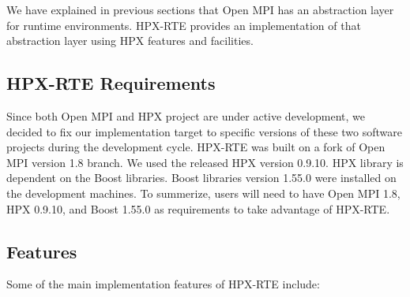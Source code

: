 We have explained in previous sections that Open MPI has an abstraction layer for runtime environments. HPX-RTE provides an implementation of that abstraction layer using HPX features and facilities.

\subsection{HPX-RTE Requirements}
Since both Open MPI and HPX project are under active development, we decided to fix our implementation target to specific versions of these two software projects during the development cycle. HPX-RTE was built on a fork of Open MPI version 1.8 branch. We used the released HPX version 0.9.10. HPX library is dependent on the Boost libraries. Boost libraries version 1.55.0 were installed on the development machines.
To summerize, users will need to have Open MPI 1.8, HPX 0.9.10, and Boost 1.55.0 as requirements to take advantage of HPX-RTE.

\subsection{Features}
Some of the main implementation features of HPX-RTE include:


